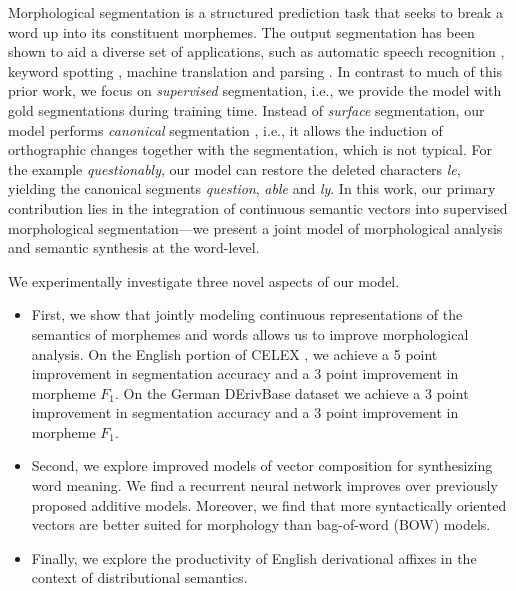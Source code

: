 \documentclass[11pt,letterpaper]{article}
\newcommand{\word}[1]{{\em #1}}
\begin{document}
Morphological segmentation is a structured prediction task that seeks
to break a word up into its constituent morphemes. The output
segmentation has been shown to aid a diverse set of applications, such
as automatic speech recognition \cite{afify2006use}, keyword spotting
\cite{narasimhanmorphological}, machine translation
\cite{clifton2011combining} and parsing \cite{seeker2015graph}. In
contrast to much of this prior work, we focus on {\em supervised}
segmentation, i.e., we provide the model with gold segmentations during
training time. Instead of \emph{surface} segmentation, our
model performs \emph{canonical} segmentation \cite{cotterell16insideout,cotterell2016canonical,kann16neural},
i.e., it
allows the induction of
orthographic changes together with the segmentation, which is not
typical. For the example \word{questionably}, our model can restore
the deleted characters \word{le}, yielding the canonical
segments
\word{question}, \word{able} and \word{ly}.
In this work, our primary contribution lies in the integration of
continuous semantic vectors into supervised morphological
segmentation---we present a joint model of morphological analysis and
semantic synthesis at the word-level.

We experimentally
investigate three novel aspects of our model.
\begin{itemize}
\item First,
we show that jointly modeling continuous representations
of the semantics of morphemes and words allows us to improve morphological analysis. On the
English portion of CELEX \cite{baayen1993celex}, we achieve a 5 point
improvement in segmentation accuracy and a 3 point improvement in
morpheme $F_1$. On the German DErivBase dataset we achieve a 3 point
improvement in segmentation accuracy and a 3 point
improvement in morpheme $F_1$. \item Second, we explore improved models of vector
composition for synthesizing word meaning.  We find a recurrent neural
network improves over previously proposed additive models. Moreover,
we find that more syntactically oriented vectors
\cite{levy2014dependency} are better suited for morphology than
bag-of-word (BOW) models. \item Finally, we explore the productivity of
English derivational affixes in the context of distributional
semantics.
\end{itemize}
\end{document}
